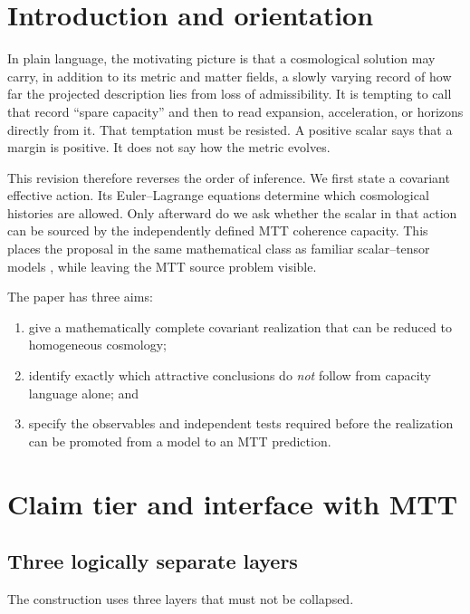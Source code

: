 \documentclass[11pt]{article}
\begin{document}
\section{Introduction and orientation}

In plain language, the motivating picture is that a cosmological solution may carry, in
addition to its metric and matter fields, a slowly varying record of how
far the projected description lies from loss of admissibility.  It is
tempting to call that record ``spare capacity'' and then to read
expansion, acceleration, or horizons directly from it.  That temptation
must be resisted.  A positive scalar says that a margin is positive.  It
does not say how the metric evolves.

This revision therefore reverses the order of inference.  We first state
a covariant effective action.  Its Euler--Lagrange equations determine
which cosmological histories are allowed.  Only afterward do we ask
whether the scalar in that action can be sourced by the independently
defined MTT coherence capacity.  This places the proposal in the same
mathematical class as familiar scalar--tensor models
\cite{brans_dicke_1961,horndeski_1974,bellini_sawicki_2014}, while leaving
the MTT source problem visible.

The paper has three aims:
\begin{enumerate}
\item give a mathematically complete covariant realization that can be
reduced to homogeneous cosmology;
\item identify exactly which attractive conclusions do \emph{not} follow
from capacity language alone; and
\item specify the observables and independent tests required before the
realization can be promoted from a model to an MTT prediction.
\end{enumerate}

\section{Claim tier and interface with MTT}

\subsection{Three logically separate layers}

The construction uses three layers that must not be collapsed.
\end{document}
